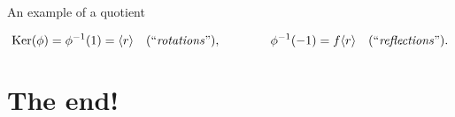 \documentclass[8pt, handout]{beamer}
\begin{document}
\begin{frame}{An example of a quotient}
  \vspace{-4mm}
  
  \[
  \operatorname{Ker}(\phi)=\phi^{-1}(1)=\langle r\rangle\quad (\text{``\emph{rotations}''}),\qquad\qquad
  \phi^{-1}(-1)=f\langle r\rangle\quad (\text{``\emph{reflections}''}).
  \]
  
\end{frame}

\section{The end!}
\end{document}
